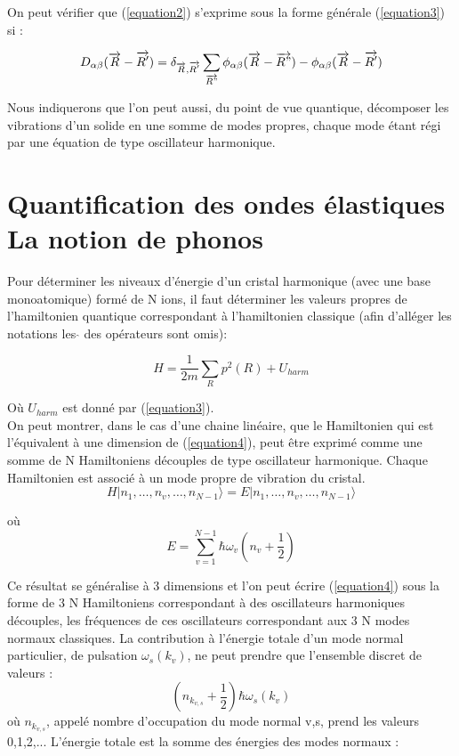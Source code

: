 On peut vérifier que (\ref{equation2}) s'exprime sous la forme générale (\ref{equation3}) si :

\begin{equation}
D_{\alpha\beta} (\overrightarrow{R}-\overrightarrow{R'}) = \delta_{\overrightarrow{R},\overrightarrow{R'}} \sum_{\overrightarrow{R"}} \phi_{\alpha\beta} (\overrightarrow{R}-\overrightarrow{R"}) - \phi_{\alpha\beta} (\overrightarrow{R}-\overrightarrow{R'})
\end{equation}

Nous indiquerons que l'on peut aussi, du point de vue quantique, décomposer les vibrations d'un solide en une somme de modes propres, chaque mode étant régi par une équation de type oscillateur harmonique.

\section{Quantification des ondes élastiques La notion de phonos}

Pour déterminer les niveaux d'énergie d'un cristal harmonique (avec une base monoatomique) formé de N ions, il faut déterminer les valeurs propres de l'hamiltonien quantique correspondant à l'hamiltonien classique (afin d'alléger les notations les $\hat{}$ des opérateurs sont omis):

\begin{equation}
H = \frac{1}{2m} \sum_{R} p^{2}(R) + U_{harm} \label{equation4}
\end{equation}

Où $U_{harm}$ est donné par (\ref{equation3}).
\\

On peut montrer, dans le cas d'une chaine linéaire, que le Hamiltonien qui est l'équivalent à une dimension de (\ref{equation4}), peut être exprimé comme une somme de N Hamiltoniens découples de type oscillateur harmonique. Chaque Hamiltonien est associé à un mode propre de vibration du cristal.
\begin{equation}
H|n_{1},\ldots,n_{v},\ldots,n_{N-1}\rangle = E|n_{1},\ldots,n_{v},\ldots,n_{N-1}\rangle
\end{equation}

où
\begin{equation}
E = \sum_{v=1}^{N-1}\hbar\omega_{v}\left(n_{v}+\frac{1}{2}\right)
\end{equation}

Ce résultat se généralise à 3 dimensions et l'on peut écrire (\ref{equation4}) sous la forme de 3 N Hamiltoniens correspondant à des oscillateurs harmoniques découples, les fréquences de ces oscillateurs correspondant aux 3 N modes normaux classiques. La contribution à l'énergie totale d'un mode normal particulier, de pulsation $\omega_{s}(k_{v})$, ne peut prendre que l'ensemble discret de valeurs :
\begin{equation}
\left(n_{k_{v,s}}+\frac{1}{2}\right)\hbar\omega_{s}(k_{v})
\end{equation}
où $n_{k_{v,s}}$, appelé nombre d'occupation du mode normal v,s, prend les valeurs 0,1,2,... L'énergie totale est la somme des énergies des modes normaux :

